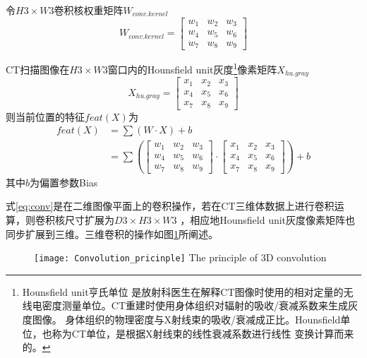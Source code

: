 令$H3 \times W3$卷积核权重矩阵$W_{conv.kernel}$
\begin{equation}
    W_{conv.kernel} = \begin{bmatrix}
        w_1 & w_2 & w_3 \\
        w_4 & w_5 & w_6 \\
        w_7 & w_8 & w_9
    \end{bmatrix}
\end{equation}

CT扫描图像在$H3 \times W3$窗口内的Hounsfield unit\cite{HU2016CT}灰度\footnote{Hounsfield unit亨氏单位
是放射科医生在解释CT图像时使用的相对定量的无线电密度测量单位。CT重建时使用身体组织对辐射的吸收/衰减系数来生成灰度图像。
身体组织的物理密度与X射线束的吸收/衰减成正比。Hounsfield单位，也称为CT单位，是根据X射线束的线性衰减系数进行线性
变换计算而来的。}像素矩阵$X_{hu.gray}$
\begin{equation}
    X_{hu.gray} = \begin{bmatrix}
        x_1 & x_2 & x_3 \\
        x_4 & x_5 & x_6 \\
        x_7 & x_8 & x_9
    \end{bmatrix}
\end{equation}
则当前位置的特征$feat(X)$为
\begin{equation}\label{eq:conv}
\begin{split}
    {feat}(X) &= \sum{\left(W \cdot X\right)} + b \\
            &= \sum{\left(\begin{bmatrix}
                        w_1 & w_2 & w_3 \\
                        w_4 & w_5 & w_6 \\
                        w_7 & w_8 & w_9
                    \end{bmatrix} \cdot 
                    \begin{bmatrix}
                        x_1 & x_2 & x_3 \\
                        x_4 & x_5 & x_6 \\
                        x_7 & x_8 & x_9
                    \end{bmatrix}\right)} + b
\end{split}
\end{equation}
其中$b$为偏置参数Bias

式\ref{eq:conv}是在二维图像平面上的卷积操作，若在CT三维体数据上进行卷积运算，则卷积核尺寸扩展为$D3 \times H3 \times W3$
，相应地Hounsfield unit灰度像素矩阵也同步扩展到三维。三维卷积的操作如图\ref{fig:3D_Conv}所阐述。
\begin{figure}[!htp]
    \centering
    \texttt{[image: Convolution\_pricinple]}
        {The principle of 3D convolution}
    \label{fig:3D_Conv}
\end{figure}

